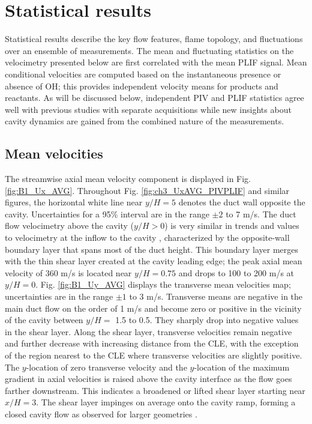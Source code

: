 \section*{Statistical results}
Statistical results describe the key flow features, flame topology, and fluctuations over an ensemble of measurements. The mean and fluctuating statistics on the velocimetry presented below are first correlated with the mean PLIF signal. Mean conditional velocities are computed based on the instantaneous presence or absence of OH; this provides independent velocity means for products and reactants. As will be discussed below, independent PIV and PLIF statistics agree well with previous studies with separate acquisitions \citep{TuttleCarterHsu2014, Kirik2017} while new insights about cavity dynamics are gained from the combined nature of the measurements.

\subsection*{Mean velocities}
The streamwise axial mean velocity component is displayed in Fig. \ref{fig:B1_Ux_AVG}. Throughout Fig. \ref{fig:ch3_UxAVG_PIVPLIF} and similar figures, the horizontal white line near $y/H=5$ denotes the duct wall opposite the cavity. Uncertainties for a 95\% interval are in the range $\pm2$ to 7 m/s. The duct flow velocimetry above the cavity ($y/H>0$) is very similar in trends and values to velocimetry at the inflow to the cavity \citep{LieberThesis}, characterized by the opposite-wall boundary layer that spans most of the duct height. This boundary layer merges with the thin shear layer created at the cavity leading edge; the peak axial mean velocity of 360 m/s is located near $y/H = 0.75$ and drops to 100 to 200 m/s at $y/H=0$. Fig. \ref{fig:B1_Uy_AVG} displays the transverse mean velocities map;  uncertainties are in the range $\pm1$ to 3 m/s. Transverse means are negative in the main duct flow on the order of 1 m/s and become zero or positive in the vicinity of the cavity between $y/H =$ 1.5 to 0.5. They sharply drop into negative values in the shear layer. Along the shear layer, transverse velocities remain negative and further decrease with increasing distance from the CLE, with the exception of the region nearest to the CLE where transverse velocities are slightly positive. The $y$-location of zero transverse velocity and the $y$-location of the maximum gradient in axial velocities is raised above the cavity interface as the flow goes farther downstream. This indicates a broadened or lifted shear layer starting near $x/H=3$. The shear layer impinges on average onto the cavity ramp, forming a closed cavity flow as observed for larger geometries \citep{Kirik2017}. 

